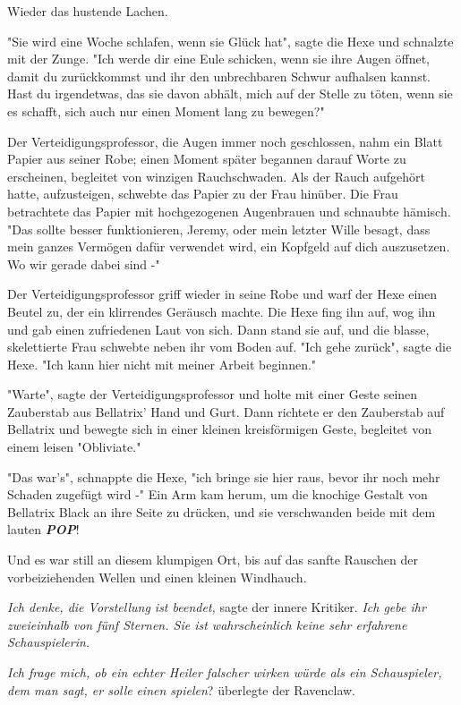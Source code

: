 {Wieder das hustende Lachen.

"Sie wird eine Woche schlafen, wenn sie Glück hat", sagte die Hexe und schnalzte mit der Zunge. "Ich werde dir eine Eule schicken, wenn sie ihre Augen öffnet, damit du zurückkommst und ihr den unbrechbaren Schwur aufhalsen kannst. Hast du irgendetwas, das sie davon abhält, mich auf der Stelle zu töten, wenn sie es schafft, sich auch nur einen Moment lang zu bewegen?"

Der Verteidigungsprofessor, die Augen immer noch geschlossen, nahm ein Blatt Papier aus seiner Robe; einen Moment später begannen darauf Worte zu erscheinen, begleitet von winzigen Rauchschwaden. Als der Rauch aufgehört hatte, aufzusteigen, schwebte das Papier zu der Frau hinüber. Die Frau betrachtete das Papier mit hochgezogenen Augenbrauen und schnaubte hämisch. "Das sollte besser funktionieren, Jeremy, oder mein letzter Wille besagt, dass mein ganzes Vermögen dafür verwendet wird, ein Kopfgeld auf dich auszusetzen. Wo wir gerade dabei sind -"

Der Verteidigungsprofessor griff wieder in seine Robe und warf der Hexe einen Beutel zu, der ein klirrendes Geräusch machte. Die Hexe fing ihn auf, wog ihn und gab einen zufriedenen Laut von sich. Dann stand sie auf, und die blasse, skelettierte Frau schwebte neben ihr vom Boden auf. "Ich gehe zurück", sagte die Hexe. "Ich kann hier nicht mit meiner Arbeit beginnen."

"Warte", sagte der Verteidigungsprofessor und holte mit einer Geste seinen Zauberstab aus Bellatrix' Hand und Gurt. Dann richtete er den Zauberstab auf Bellatrix und bewegte sich in einer kleinen kreisförmigen Geste, begleitet von einem leisen "Obliviate."

"Das war's", schnappte die Hexe, "ich bringe sie hier raus, bevor ihr noch mehr Schaden zugefügt wird -" Ein Arm kam herum, um die knochige Gestalt von Bellatrix Black an ihre Seite zu drücken, und sie verschwanden beide mit dem lauten \textbf{\emph{POP}}!

Und es war still an diesem klumpigen Ort, bis auf das sanfte Rauschen der vorbeiziehenden Wellen und einen kleinen Windhauch.

\emph{Ich denke, die Vorstellung ist beendet,} sagte der innere Kritiker. \emph{Ich gebe ihr zweieinhalb von fünf Sternen. Sie ist wahrscheinlich keine sehr erfahrene Schauspielerin.}

\emph{Ich frage mich, ob ein echter Heiler falscher wirken würde als ein Schauspieler, dem man sagt, er solle} \emph{einen spielen}? überlegte der Ravenclaw.

}
